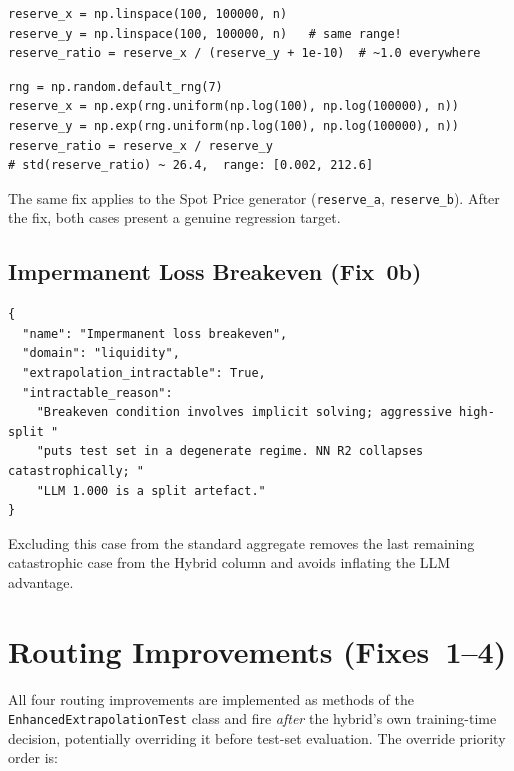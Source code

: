 \documentclass[twoside,11pt]{article}
\begin{document}
\begin{lstlisting}[caption={Buggy generator — identical linspace ranges.}]
reserve_x = np.linspace(100, 100000, n)
reserve_y = np.linspace(100, 100000, n)   # same range!
reserve_ratio = reserve_x / (reserve_y + 1e-10)  # ~1.0 everywhere
\end{lstlisting}

\begin{lstlisting}[caption={Fixed generator — independent log-uniform sampling (seed=7).}]
rng = np.random.default_rng(7)
reserve_x = np.exp(rng.uniform(np.log(100), np.log(100000), n))
reserve_y = np.exp(rng.uniform(np.log(100), np.log(100000), n))
reserve_ratio = reserve_x / reserve_y
# std(reserve_ratio) ~ 26.4,  range: [0.002, 212.6]
\end{lstlisting}

The same fix applies to the Spot Price generator
(\texttt{reserve\_a}, \texttt{reserve\_b}).  After the fix, both cases present
a genuine regression target.

\subsection{Impermanent Loss Breakeven (Fix~0b)}

\begin{lstlisting}[caption={Intractable flag added to IL Breakeven catalogue entry.}]
{
  "name": "Impermanent loss breakeven",
  "domain": "liquidity",
  "extrapolation_intractable": True,
  "intractable_reason":
    "Breakeven condition involves implicit solving; aggressive high-split "
    "puts test set in a degenerate regime. NN R2 collapses catastrophically; "
    "LLM 1.000 is a split artefact."
}
\end{lstlisting}

Excluding this case from the standard aggregate removes the last remaining
catastrophic case from the Hybrid column and avoids inflating the LLM
advantage.

\section{Routing Improvements (Fixes~1--4)}
\label{sec:routing_fixes}

All four routing improvements are implemented as methods of the
\texttt{EnhancedExtrapolationTest} class and fire \emph{after} the hybrid's
own training-time decision, potentially overriding it before test-set
evaluation.  The override priority order is:
\end{document}
